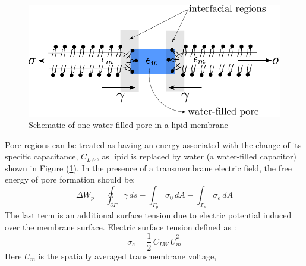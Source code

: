 \documentclass[english,12pt]{article}
\begin{document}
\begin{figure}[H]
	\centering
	\includegraphics[scale=0.8]{pics/pore1_1.pdf}
	\caption{\footnotesize{Schematic of one water-filled pore in a lipid membrane}}
	\label{fig:pore1}
\end{figure}
Pore regions can be treated as having an energy associated with the change of its specific capacitance, $C_{LW}$, as lipid is replaced by water (a water-filled capacitor) shown in Figure (\ref{fig:pore1}). 
In the presence of a transmembrane electric field, the free energy of pore formation should be:
\begin{equation}
\Delta W_{p} = \oint_{\partial\Gamma}\gamma\,ds - \int_{\Gamma_p}\sigma_0\,dA-\int_{\Gamma_p}\sigma_e\,dA 
\label{eqn:poreenergy}
\end{equation}
The last term is an additional surface tension due to electric potential induced over the membrane surface. Electric surface tension defined as \cite{Weaver1996135}:
\begin{equation}
	\sigma_e=\frac{1}{2}\,C_{LW}\,\bar{U}_{m}^{2}
	\label{eqn:elecsurface}
\end{equation}
 Here $\bar{U}_{m}$ is the spatially averaged transmembrane voltage, 
\end{document}
